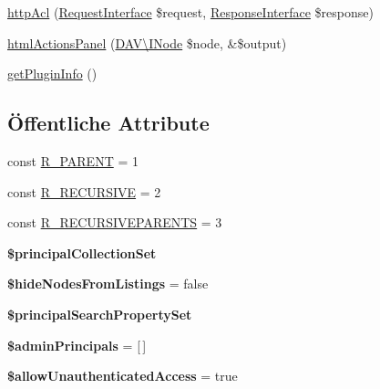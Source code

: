 \begin{DoxyCompactItemize}
\item 
\mbox{\hyperlink{class_sabre_1_1_d_a_v_a_c_l_1_1_plugin_aea90f69563141590374dcee037956bff}{http\+Acl}} (\mbox{\hyperlink{interface_sabre_1_1_h_t_t_p_1_1_request_interface}{Request\+Interface}} \$request, \mbox{\hyperlink{interface_sabre_1_1_h_t_t_p_1_1_response_interface}{Response\+Interface}} \$response)
\item 
\mbox{\hyperlink{class_sabre_1_1_d_a_v_a_c_l_1_1_plugin_ab96123f520a429247f6c12c6a0303176}{html\+Actions\+Panel}} (\mbox{\hyperlink{interface_sabre_1_1_d_a_v_1_1_i_node}{D\+A\+V\textbackslash{}\+I\+Node}} \$node, \&\$output)
\item 
\mbox{\hyperlink{class_sabre_1_1_d_a_v_a_c_l_1_1_plugin_a2556b6d48e26b9d1d390b5f08dfe70c7}{get\+Plugin\+Info}} ()
\end{DoxyCompactItemize}
\subsection*{Öffentliche Attribute}
\begin{DoxyCompactItemize}
\item 
const \mbox{\hyperlink{class_sabre_1_1_d_a_v_a_c_l_1_1_plugin_aa8e37f9c2a8e7291cafe37778be8f10b}{R\+\_\+\+P\+A\+R\+E\+NT}} = 1
\item 
const \mbox{\hyperlink{class_sabre_1_1_d_a_v_a_c_l_1_1_plugin_a8cdab25ac96ad88a4ebdaaa8e4cc27e9}{R\+\_\+\+R\+E\+C\+U\+R\+S\+I\+VE}} = 2
\item 
const \mbox{\hyperlink{class_sabre_1_1_d_a_v_a_c_l_1_1_plugin_a38f164c83042d87ec5c819564dca44a9}{R\+\_\+\+R\+E\+C\+U\+R\+S\+I\+V\+E\+P\+A\+R\+E\+N\+TS}} = 3
\item 
{\bfseries \$principal\+Collection\+Set}
\item 
\mbox{\label{class_sabre_1_1_d_a_v_a_c_l_1_1_plugin_a861e2d13ed4785897d892285bfc574da}} 
{\bfseries \$hide\+Nodes\+From\+Listings} = false
\item 
{\bfseries \$principal\+Search\+Property\+Set}
\item 
\mbox{\label{class_sabre_1_1_d_a_v_a_c_l_1_1_plugin_a3048852878a2d62181500274753d6424}} 
{\bfseries \$admin\+Principals} = \mbox{[}$\,$\mbox{]}
\item 
\mbox{\label{class_sabre_1_1_d_a_v_a_c_l_1_1_plugin_ad9ca0b26b614ffcd23066db176e476ed}} 
{\bfseries \$allow\+Unauthenticated\+Access} = true
\end{DoxyCompactItemize}
